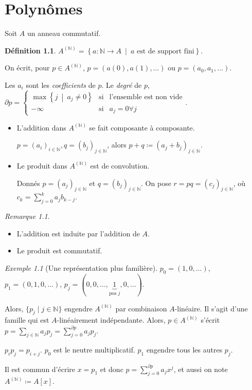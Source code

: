 \documentclass{report}
\theoremstyle{definition}
\newtheorem*{dfn}{D\'efinition}
\theoremstyle{remark}
\newtheorem*{exem}{Exemple}
\newtheorem*{rmq}{Remarque}
\def\NN{\mathbb{N}}
\begin{document}
	\chapter{Polyn\^omes}
	Soit $A$ un anneau commutatif.

	\begin{dfn}
		$A^{(\NN)} = \left\{ a:\NN\to A ~\middle|~ a \text{ est de support fini} \right\}$.

		On \'ecrit, pour $p\in A^{(\NN)}$, $p=(a(0), a(1), \dots)$ ou $p=(a_0,a_1,\dots)$.

		Les $a_i$ sont les \emph{coefficients} de $p$. Le \emph{degr\'e} de $p$, $\partial p = \left\{ \begin{array}{rcl}
			\max\left\{ j ~\middle|~ a_j\neq0 \right\}&\text{si}&\text{l'ensemble est non vide}\\
			-\infty&\text{si}&a_j=0\forall j
		\end{array} \right.$.

		\begin{itemize}
			\item L'addition dans $A^{(\NN)}$ se fait composante \`a composante.

			$p=(a_i)_{i\in\NN}, q=(b_j)_{j\in\NN}$, alors $p+q \coloneq (a_j+b_j)_{j\in\NN}$.
			\item Le produit dans $A^{(\NN)}$ est de convolution.

			Donn\'es $p=(a_j)_{j\in\NN}$ et $q=(b_j)_{j\in\NN}$. On pose $r=pq=(c_j)_{j\in\NN}$, o\`u $c_k = \sum_{j=0}^{k}a_jb_{k-j}$.
		\end{itemize}
	\end{dfn}

	\begin{rmq}
		\begin{itemize}
			\item L'addition est induite par l'addition de $A$.
			\item Le produit est commutatif.
		\end{itemize}
	\end{rmq}

	\begin{exem}[Une repr\'esentation plus famili\`ere]
		$p_0=(1,0,\dots)$, $p_1=(0,1,0,\dots)$, $p_j=(0,0,\dots,\underbrace{1}_{\text{pos }j},0,\dots)$.

		Alors, $\{p_j \mid j\in\NN\}$ engendre $A^{(\NN)}$ par combinaison $A$-lin\'eaire. Il s'agit d'une famille qui est $A$-lin\'eairement ind\'ependante. Alors, $p\in A^{(\NN)}$ s'\'ecrit $p = \sum_{j\in\NN}a_jp_j = \sum_{j=0}^{\partial p}a_jp_j$.

		$p_ip_j = p_{i+j}$. $p_0$ est le neutre multiplicatif. $p_1$ engendre tous les autres $p_j$.

		Il est commun d'\'ecrire $x=p_1$ et donc $p=\sum_{j=0}^{\partial p}a_jx^j$, et aussi on note $A^{(\NN)} \coloneq A[x]$.
	\end{exem}
\end{document}
